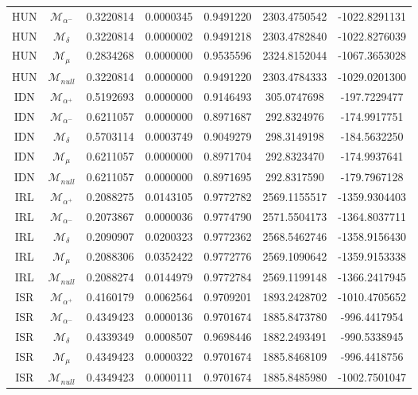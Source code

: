 \begin{tabular}{ccccccc}
HUN & $\mathcal{M}_{\alpha^-}$ & 0.3220814 & 0.0000345 & 0.9491220 & 2303.4750542 & -1022.8291131\\
HUN & $\mathcal{M}_{\delta}$ & 0.3220814 & 0.0000002 & 0.9491218 & 2303.4782840 & -1022.8276039\\
HUN & $\mathcal{M}_{\mu}$ & 0.2834268 & 0.0000000 & 0.9535596 & 2324.8152044 & -1067.3653028\\
HUN & $\mathcal{M}_{null}$ & 0.3220814 & 0.0000000 & 0.9491220 & 2303.4784333 & -1029.0201300\\
IDN & $\mathcal{M}_{\alpha^+}$ & 0.5192693 & 0.0000000 & 0.9146493 & 305.0747698 & -197.7229477\\
IDN & $\mathcal{M}_{\alpha^-}$ & 0.6211057 & 0.0000000 & 0.8971687 & 292.8324976 & -174.9917751\\
IDN & $\mathcal{M}_{\delta}$ & 0.5703114 & 0.0003749 & 0.9049279 & 298.3149198 & -184.5632250\\
IDN & $\mathcal{M}_{\mu}$ & 0.6211057 & 0.0000000 & 0.8971704 & 292.8323470 & -174.9937641\\
IDN & $\mathcal{M}_{null}$ & 0.6211057 & 0.0000000 & 0.8971695 & 292.8317590 & -179.7967128\\
IRL & $\mathcal{M}_{\alpha^+}$ & 0.2088275 & 0.0143105 & 0.9772782 & 2569.1155517 & -1359.9304403\\
IRL & $\mathcal{M}_{\alpha^-}$ & 0.2073867 & 0.0000036 & 0.9774790 & 2571.5504173 & -1364.8037711\\
IRL & $\mathcal{M}_{\delta}$ & 0.2090907 & 0.0200323 & 0.9772362 & 2568.5462746 & -1358.9156430\\
IRL & $\mathcal{M}_{\mu}$ & 0.2088306 & 0.0352422 & 0.9772776 & 2569.1090642 & -1359.9153338\\
IRL & $\mathcal{M}_{null}$ & 0.2088274 & 0.0144979 & 0.9772784 & 2569.1199148 & -1366.2417945\\
ISR & $\mathcal{M}_{\alpha^+}$ & 0.4160179 & 0.0062564 & 0.9709201 & 1893.2428702 & -1010.4705652\\
ISR & $\mathcal{M}_{\alpha^-}$ & 0.4349423 & 0.0000136 & 0.9701674 & 1885.8473780 & -996.4417954\\
ISR & $\mathcal{M}_{\delta}$ & 0.4339349 & 0.0008507 & 0.9698446 & 1882.2493491 & -990.5338945\\
ISR & $\mathcal{M}_{\mu}$ & 0.4349423 & 0.0000322 & 0.9701674 & 1885.8468109 & -996.4418756\\
ISR & $\mathcal{M}_{null}$ & 0.4349423 & 0.0000111 & 0.9701674 & 1885.8485980 & -1002.7501047\\

\end{tabular}
